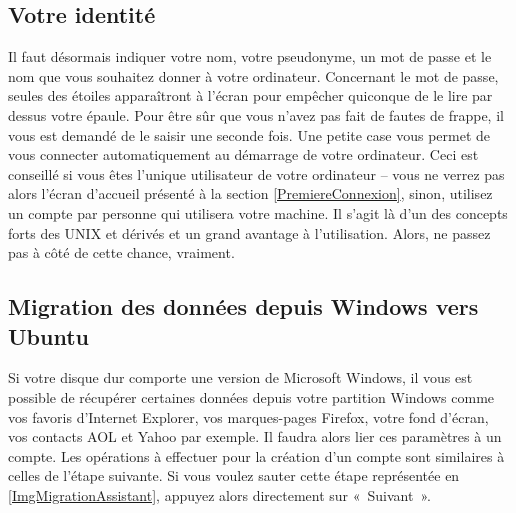 \subsection{Votre identité}
\label{InstallIdentite}
Il faut désormais indiquer votre nom, votre pseudonyme, un mot de passe et le nom que vous souhaitez donner à votre ordinateur. Concernant le mot de passe, seules des étoiles apparaîtront à l'écran pour empêcher quiconque de le lire par dessus votre épaule. Pour être sûr que vous n'avez pas fait de fautes de frappe, il vous est demandé de le saisir une seconde fois. Une petite case vous permet de vous connecter automatiquement au démarrage de votre ordinateur. Ceci est conseillé si vous êtes l'unique utilisateur de votre ordinateur -- vous ne verrez pas alors l'écran d'accueil présenté à la section \ref{PremiereConnexion}, sinon, utilisez un compte par personne qui utilisera votre machine. Il s'agit là d'un des concepts forts des UNIX et dérivés et un grand avantage à l'utilisation. Alors, ne passez pas à côté de cette chance, vraiment.\par
{}
\subsection{Migration des données depuis Windows vers Ubuntu}
Si votre disque dur comporte une version de Microsoft Windows, il vous est possible de récupérer certaines données depuis votre partition Windows comme vos favoris d'Internet Explorer, vos marques-pages Firefox, votre fond d'écran, vos contacts AOL et Yahoo par exemple. Il faudra alors lier ces paramètres à un compte. Les opérations à effectuer pour la création d'un compte sont similaires à celles de l'étape suivante. Si vous voulez sauter cette étape représentée en \ref{ImgMigrationAssistant}, appuyez alors directement sur «~Suivant~».\par
{}
